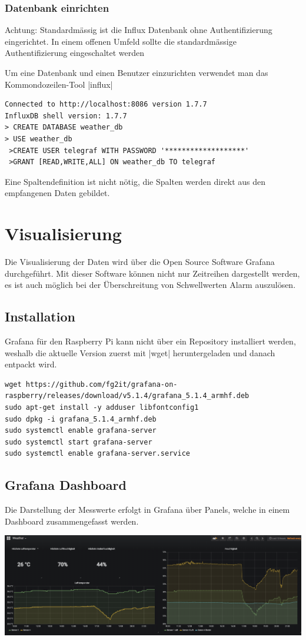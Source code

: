 \documentclass[
  12pt, %
  a4paper, %
  oneside, %
  openany, 
  numbers=noenddot, %
  BCOR=5mm, %
  parskip=half*, %
  thesis, %
]{bfhbook}
\begin{document}
   \subsubsection{Datenbank einrichten}
{\color{red}Achtung: Standardmässig ist die Influx Datenbank ohne Authentifizierung eingerichtet. In einem offenen Umfeld sollte die standardmässige Authentifizierung eingeschaltet werden \cite{influxAuth}}

Um eine Datenbank und einen Benutzer einzurichten verwendet man das Kommondozeilen-Tool |influx|
 \begin{verbatim}
Connected to http://localhost:8086 version 1.7.7
InfluxDB shell version: 1.7.7
> CREATE DATABASE weather_db
> USE weather_db
 >CREATE USER telegraf WITH PASSWORD '*******************'
 >GRANT [READ,WRITE,ALL] ON weather_db TO telegraf
 \end{verbatim}
 Eine Spaltendefinition ist nicht nötig, die Spalten werden direkt aus den empfangenen Daten gebildet.
\section{Visualisierung}
Die Visualisierung der Daten wird über die Open Source Software Grafana \cite{grafana} durchgeführt. Mit dieser Software können nicht nur Zeitreihen dargestellt werden, es ist auch möglich bei der Überschreitung von Schwellwerten Alarm auszulösen.
\subsection{Installation}
Grafana für den Raspberry Pi kann nicht über ein Repository installiert werden, weshalb die aktuelle Version zuerst mit |wget| heruntergeladen und danach entpackt wird.
 \begin{verbatim}
wget https://github.com/fg2it/grafana-on-raspberry/releases/download/v5.1.4/grafana_5.1.4_armhf.deb
sudo apt-get install -y adduser libfontconfig1
sudo dpkg -i grafana_5.1.4_armhf.deb
sudo systemctl enable grafana-server
sudo systemctl start grafana-server
sudo systemctl enable grafana-server.service
   \end{verbatim}
   \subsection{Grafana Dashboard}
Die Darstellung der Messwerte erfolgt in Grafana über Panels, welche in einem Dashboard \cite{grafanaDashboard} zusammengefasst werden.
\begin{center}
   \includegraphics[width=17cm]{Bilder/Grafana-Dashboard.PNG}
   \captionsetup{justification=centering}
\end{center}
\end{document}
